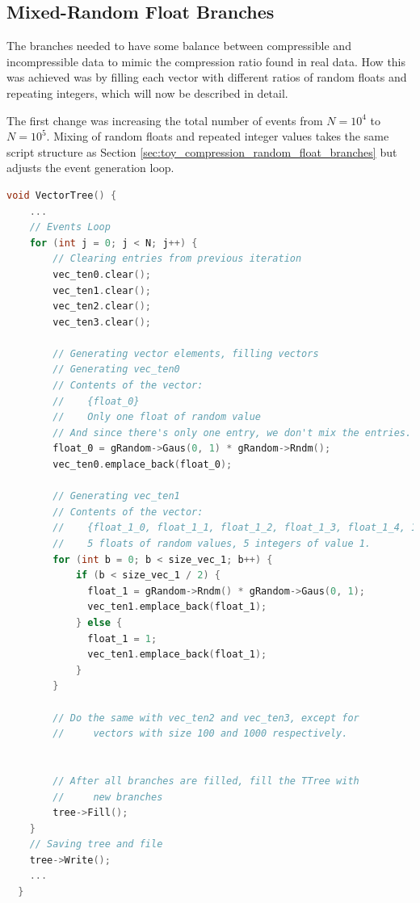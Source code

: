 

\subsection{Mixed-Random Float Branches}
The branches needed to have some balance between compressible and incompressible data to mimic the compression ratio found in real data.
How this was achieved was by filling each vector with different ratios of random floats and repeating integers, which will now be described in detail.

The first change was increasing the total number of events from $N = 10^4$ to $N = 10^5$. 
Mixing of random floats and repeated integer values takes the same script structure as Section \ref{sec:toy_compression_random_float_branches} but adjusts the event generation loop.

\begin{lstlisting}[language=C]  
  void VectorTree() {
    ...
    // Events Loop
    for (int j = 0; j < N; j++) {
        // Clearing entries from previous iteration
        vec_ten0.clear();
        vec_ten1.clear();
        vec_ten2.clear();
        vec_ten3.clear();

        // Generating vector elements, filling vectors
        // Generating vec_ten0
        // Contents of the vector:
        //    {float_0}
        //    Only one float of random value
        // And since there's only one entry, we don't mix the entries. 
        float_0 = gRandom->Gaus(0, 1) * gRandom->Rndm();
        vec_ten0.emplace_back(float_0);

        // Generating vec_ten1
        // Contents of the vector:
        //    {float_1_0, float_1_1, float_1_2, float_1_3, float_1_4, 1, 1, 1, 1, 1}
        //    5 floats of random values, 5 integers of value 1.
        for (int b = 0; b < size_vec_1; b++) {
            if (b < size_vec_1 / 2) {
              float_1 = gRandom->Rndm() * gRandom->Gaus(0, 1);
              vec_ten1.emplace_back(float_1);
            } else {
              float_1 = 1;
              vec_ten1.emplace_back(float_1);
            }
        }

        // Do the same with vec_ten2 and vec_ten3, except for 
        //     vectors with size 100 and 1000 respectively. 


        // After all branches are filled, fill the TTree with 
        //     new branches
        tree->Fill(); 
    }
    // Saving tree and file
    tree->Write();
    ...
  }
\end{lstlisting}

